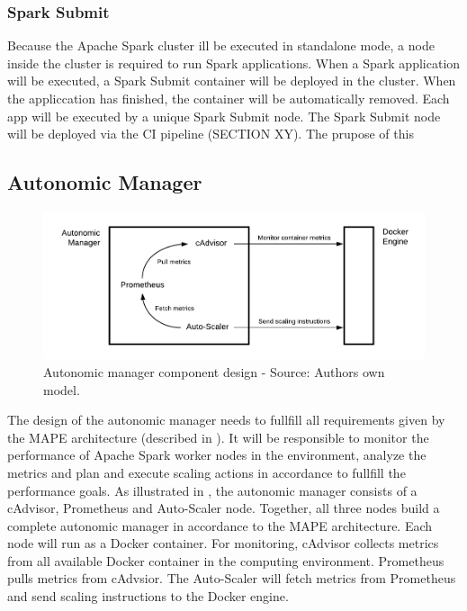 \subsubsection{Spark Submit}
Because the Apache Spark cluster ill be executed in standalone mode, a node inside the cluster is required to run Spark applications. When a Spark application will be executed, a Spark Submit container will be deployed in the cluster. When the appliccation has finished, the container will be automatically removed.
Each app will be executed by a unique Spark Submit node.
The Spark Submit node will be deployed via the CI pipeline (SECTION XY). The prupose of this 


\subsection{Autonomic Manager}
\label{subsec:05_arch_am}

\begin{figure}[h]
\centering
\includegraphics[scale=0.85]{images/05_conceptual_design/autonomic_manager/autonomic_manager_overview}
\caption{Autonomic manager component design - Source: Authors own model.}
\label{fig:am-design-component}
\end{figure}

The design of the autonomic manager needs to fullfill all requirements given by the MAPE architecture (described in ). It will be responsible to monitor the performance of Apache Spark worker nodes in the environment, analyze the metrics and plan and execute scaling actions in accordance to fullfill the performance goals.
As illustrated in , the autonomic manager consists of a cAdvisor, Prometheus and Auto-Scaler node. Together, all three nodes build a complete autonomic manager in accordance to the MAPE architecture. Each node will run as a Docker container.
For monitoring, cAdvisor collects metrics from all available Docker container in the computing environment. Prometheus pulls metrics from cAdvsior. The Auto-Scaler will fetch metrics from Prometheus and send scaling instructions to the Docker engine.


